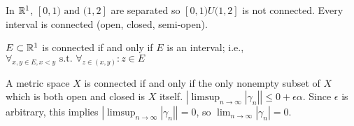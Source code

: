 \begin{example}
	In $\mathbb{R}^{1}$, $[0,1) \text{ and }  (1,2]$ are separated so $[0,1) U (1,2]$ is not connected. Every interval is connected (open, closed, semi-open).
\end{example}

\begin{theorem}
	\label{2.37}
	$E \subset \mathbb{R}^{1}$ is connected if and only if $E$ is an interval; i.e., $\forall_{x,y \in E,x<y} \text{ s.t. }  \forall_{z \in (x,y)}:z \in E $
\end{theorem}

\begin{theorem}
	A metric space $X$ is connected if and only if the only nonempty subset of $X$ which is both open and closed is $X$ itself.
	$|\limsup_{n\to \infty}{|\gamma_n|}|\le 0+\epsilon \alpha$. Since $\epsilon$ is arbitrary, this implies $|\limsup_{n\to \infty}{|\gamma_n|}|=0$, so $\lim_{n\to \infty}{|\gamma_n|}=0$.
\end{theorem}

